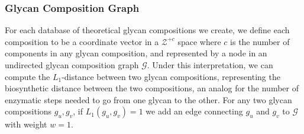     \subsubsection{Glycan Composition Graph}
        For each database of theoretical glycan compositions we create, we
        define each composition to be a coordinate vector in a $\mathcal{Z}^{+c}$
        space where $c$ is the number of components in any glycan composition,
        and represented by a node in an undirected glycan composition
        graph $\mathcal{G}$. Under this interpretation, we can compute the
        $L_1$-distance between two glycan compositions, representing the biosynthetic
        distance between the two compositions, an analog for the number of enzymatic
        steps needed to go from one glycan to the other. For any two glycan
        compositions $g_u, g_v$, if $L_1(g_u, g_v) = 1$ we add an edge
        connecting $g_u$ and $g_v$ to $\mathcal{G}$ with weight $w = 1$.
